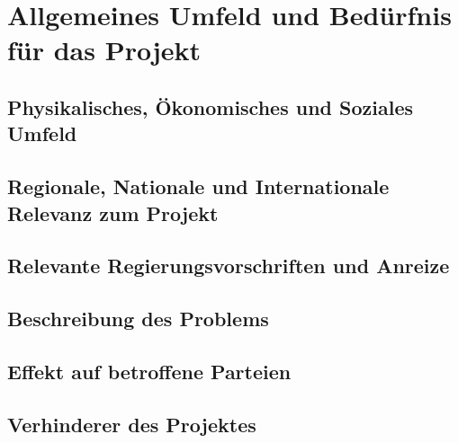 \chapter{Allgemeines Umfeld und Bedürfnis für das Projekt}

\section{Physikalisches, Ökonomisches und Soziales Umfeld}

\section{Regionale, Nationale und Internationale Relevanz zum Projekt}

\section{Relevante Regierungsvorschriften und Anreize}

\section{Beschreibung des Problems}

\section{Effekt auf betroffene Parteien}

\section{Verhinderer des Projektes}
